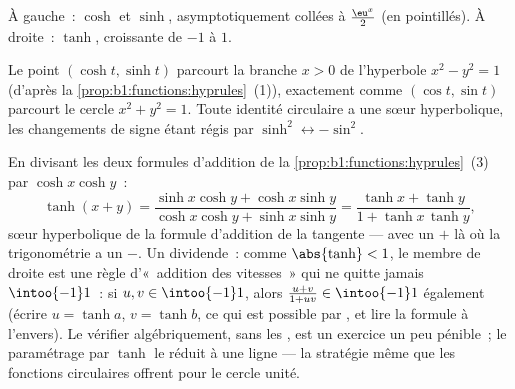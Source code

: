 \begin{omfigure}

{\small À gauche~: $\cosh$ et $\sinh$, asymptotiquement collées à
$\frac{\eu^x}{2}$ (en pointillés). À droite~: $\tanh$, croissante de
$-1$ à $1$.}
\end{omfigure}

\begin{remark}
Le point $(\cosh t, \sinh t)$ parcourt la branche $x > 0$ de
l'hyperbole $x^2 - y^2 = 1$ (d'après la
\cref{prop:b1:functions:hyprules}~(1)), exactement comme $(\cos t,
\sin t)$ parcourt le cercle $x^2 + y^2 = 1$. Toute identité circulaire
a une sœur hyperbolique, les changements de signe étant régis par
$\sinh^2 \leftrightarrow -\sin^2$.
\end{remark}

\begin{example}\label{ex:b1:functions:tanhadd}
En divisant les deux formules d'addition de la
\cref{prop:b1:functions:hyprules}~(3) par $\cosh x\cosh y$~:
\[
\tanh(x + y)
= \frac{\sinh x\cosh y + \cosh x\sinh y}
{\cosh x\cosh y + \sinh x\sinh y}
= \frac{\tanh x + \tanh y}{1 + \tanh x\,\tanh y} ,
\]
sœur hyperbolique de la formule d'addition de la tangente --- avec un
$+$ là où la trigonométrie a un $-$. Un dividende~: comme
$\abs{\tanh} < 1$, le membre de droite est une règle d'«~addition des
vitesses~» qui ne quitte jamais $\intoo{-1}1$~: si $u, v \in
\intoo{-1}1$, alors $\frac{u + v}{1 + uv} \in \intoo{-1}1$ également
(écrire $u = \tanh a$, $v = \tanh b$, ce qui est possible par
, et lire la formule à l'envers). Le vérifier
algébriquement, sans les , est un exercice un
peu pénible~; le paramétrage par $\tanh$ le réduit à une ligne --- la
stratégie même que les fonctions circulaires offrent pour le cercle
unité.
\end{example}

